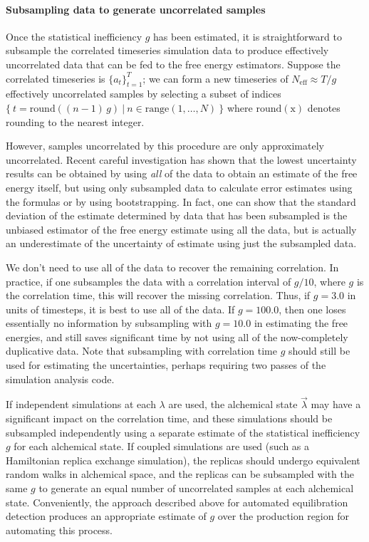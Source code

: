 \documentclass[9pt,bestpractices]{livecoms}
\begin{document}
\paragraph{Subsampling data to generate uncorrelated samples}
Once the statistical inefficiency $g$ has been estimated, it is straightforward to subsample the correlated timeseries simulation data to produce effectively uncorrelated data that can be fed to the free energy estimators.
Suppose the correlated timeseries is $\{a_t\}_{t=1}^T$; we can form a new timeseries of $N_{\mathrm{eff}} \approx T / g$ effectively uncorrelated samples by selecting a subset of indices $\{ \: t = \mathrm{round}((n-1) \, g) \: | \: n \in \mathrm{range}(1,\ldots ,N) \: \}$ where $\mathrm{round(x)}$ denotes rounding to the nearest integer.

However, samples uncorrelated by this procedure are only approximately uncorrelated.  Recent careful investigation has shown that the lowest uncertainty results can be obtained by using \textit{all} of the data to obtain an estimate of the free energy itself, but using only subsampled data to calculate error estimates using the formulas or by using bootstrapping.
In fact, one can show that the standard deviation of the estimate determined by data that has been subsampled is the unbiased estimator of the free energy estimate using all the data, but is actually an underestimate of the uncertainty of estimate using just the subsampled data.

We don't need to use all of the data to recover the remaining correlation.  In practice, if one subsamples the data with a
correlation interval of $g/10$, where $g$ is the correlation time, this will recover the missing correlation.  Thus, if $g=3.0$ in units of timesteps, it is best to use all of the data.  If $g=100.0$, then one loses essentially no information by subsampling with $g=10.0$ in estimating the free energies, and still saves significant time by not using all of the now-completely duplicative data.  Note that subsampling with correlation time $g$ should still be used for estimating the uncertainties, perhaps requiring two passes of the simulation analysis code. 

If independent simulations at each $\lambda$ are used, the alchemical state $\vec{\lambda}$ may have a significant impact on the correlation time, and these simulations should be subsampled independently using a separate estimate of the statistical inefficiency $g$ for each alchemical state. If coupled simulations are used (such as a Hamiltonian replica exchange simulation), the replicas should undergo equivalent random walks in alchemical space, and the replicas can be subsampled with the same $g$ to generate an equal number of uncorrelated samples at each alchemical state. Conveniently, the approach described above for automated equilibration detection produces an appropriate estimate of $g$ over the production region for automating this process.
\end{document}
